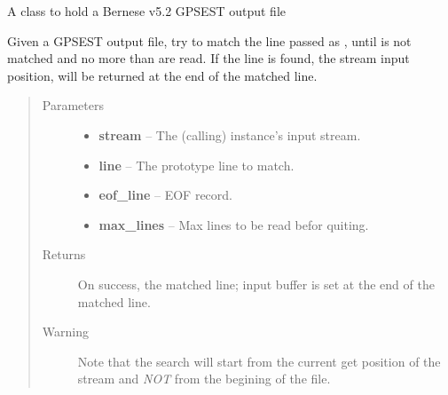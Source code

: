 \documentclass[letterpaper,10pt,english]{sphinxmanual}
\begin{document}
\begin{fulllineitems}
\label{bgps:bgps.gpsoutfile}
A class to hold a Bernese v5.2 GPSEST output file

\begin{fulllineitems}
\label{bgps:bgps.gpsoutfile.findFirstLine}
Given a GPSEST output file, try to match the line passed as
, until  is not matched and no more than
 are read.
If the line is found, the stream input position, will be returned
at the end of the matched line.
\begin{quote}\begin{description}
\item[{Parameters}] \leavevmode\begin{itemize}
\item {} 
\textbf{stream} -- The (calling) instance's input stream.

\item {} 
\textbf{line} -- The prototype line to match.

\item {} 
\textbf{eof\_line} -- EOF record.

\item {} 
\textbf{max\_lines} -- Max lines to be read befor quiting.

\end{itemize}

\item[{Returns}] \leavevmode
On success, the matched line; input buffer is set
at the end of the matched line.

\item[{Warning}] \leavevmode
Note that the search will start from the current get 
position of the stream and \emph{NOT} from the begining of 
the file.

\end{description}\end{quote}

\end{fulllineitems}



\end{fulllineitems}
\end{document}
